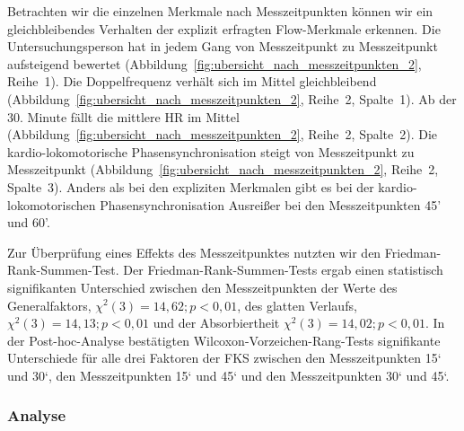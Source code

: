 Betrachten wir die einzelnen Merkmale nach Messzeitpunkten können wir ein gleichbleibendes Verhalten der explizit erfragten Flow-Merkmale erkennen. Die Untersuchungsperson hat in jedem Gang von Messzeitpunkt zu Messzeitpunkt aufsteigend bewertet (Abbildung~\ref{fig:ubersicht_nach_messzeitpunkten_2}, Reihe~1). Die Doppelfrequenz verhält sich im Mittel gleichbleibend (Abbildung~\ref{fig:ubersicht_nach_messzeitpunkten_2}, Reihe~2, Spalte~1). Ab der 30. Minute fällt die mittlere \ac{HR} im Mittel (Abbildung~\ref{fig:ubersicht_nach_messzeitpunkten_2}, Reihe~2, Spalte~2). Die kardio-lokomotorische Phasensynchronisation steigt von Messzeitpunkt zu Messzeitpunkt (Abbildung~\ref{fig:ubersicht_nach_messzeitpunkten_2}, Reihe~2, Spalte~3). Anders als bei den expliziten Merkmalen gibt es bei der kardio-lokomotorischen Phasensynchronisation Ausreißer bei den Messzeitpunkten 45' und 60'. 

Zur Überprüfung eines Effekts des Messzeitpunktes nutzten wir den Friedman-Rank-Summen-Test. Der Friedman-Rank-Summen-Tests ergab einen statistisch signifikanten Unterschied zwischen den Messzeitpunkten der Werte des Generalfaktors, $\chi^2 (3) = 14{,}62; p < 0{,}01$, des glatten Verlaufs, $\chi^2 (3) = 14{,}13; p < 0{,}01$ und der Absorbiertheit $\chi^2 (3) = 14{,}02; p < 0{,}01$. In der Post-hoc-Analyse bestätigten Wilcoxon-Vorzeichen-Rang-Tests signifikante Unterschiede für alle drei Faktoren der \ac{FKS} zwischen den Messzeitpunkten 15‘ und 30‘, den Messzeitpunkten 15‘ und 45‘ und den Messzeitpunkten 30‘ und 45‘. 

\subsubsection{Analyse} 

